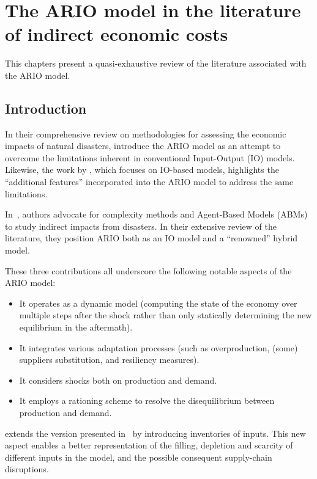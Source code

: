 \chapter{The ARIO model in the literature of indirect economic costs}
\label{sec:descr-ario-indir}

This chapters present a quasi-exhaustive review of the literature associated
with the ARIO model.

\section{Introduction}

In their comprehensive review on methodologies for assessing the economic
impacts of natural disasters, \textcite{botzen-2019-econom-impac}
introduce the ARIO model as an attempt to overcome the limitations inherent in
conventional Input-Output (IO) models. Likewise, the work by
\textcite{galbusera-2018-input-output}, which
focuses on IO-based models, highlights the ``additional features''
incorporated into the ARIO model to address the same limitations.

In~\textcite{coronese-2022-econom-impac}, authors advocate for complexity methods and
Agent-Based Models (ABMs) to study indirect impacts from disasters. In their
extensive review of the literature, they position ARIO both as an IO model and a
``renowned'' hybrid model.

These three contributions all underscore the following notable aspects of the ARIO model:
\begin{itemize}
\item It operates as a dynamic model (computing the state of the economy over multiple
steps after the shock rather than only statically determining the new
equilibrium in the aftermath).
\item It integrates various adaptation processes (such as overproduction, (some) suppliers substitution, and resiliency measures).
\item It considers shocks both on production and demand.
\item It employs a rationing scheme to resolve the disequilibrium between
production and demand.
\end{itemize}

\Textcite{hallegatte-2013-model-role} extends the version presented
in~\textcite{hallegatte-2008-adapt-region} by introducing
inventories of inputs. This new aspect enables a better representation of the filling, depletion and scarcity of
different inputs in the model, and the possible consequent supply-chain
disruptions.

